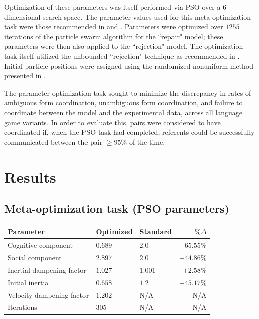 \documentclass[12pt,a4paper]{article}
\begin{document}
Optimization of these parameters was itself performed via PSO over a $6$-dimensional search space. The parameter values used for this meta-optimization task were those recommended in \cite{shi1998} and \cite{solnon2010}. Parameters were optimized over $1255$ iterations of the particle swarm algorithm for the ``repair" model; these parameters were then also applied to the ``rejection" model. The optimization task itself utilized the unbounded ``rejection" technique as recommended in \cite{engelbrecht2005}. Initial particle positions were assigned using the randomized nonuniform method presented in \cite{mitchell1991}.

The parameter optimization task sought to minimize the discrepancy in rates of ambiguous form coordination, unambiguous form coordination, and failure to coordinate between the model and the experimental data, across all language game variants. In order to evaluate this, pairs were considered to have coordinated if, when the PSO task had completed, referents could be successfully communicated between the pair $\geq 95\%$ of the time.


\section{Results}
\subsection{Meta-optimization task (PSO parameters)}
\begin{center}
    \begin{tabular}{ l l l r }
    Parameter & Optimized & Standard & $\% \Delta$ \\ \hline
    Cognitive component       & $0.689$ & $2.0$   & $-65.55\%$ \\ \hline
    Social component          & $2.897$ & $2.0$   & $+44.86\%$ \\ \hline
    Inertial dampening factor & $1.027$ & $1.001$ & $+2.58\%$\\ \hline
    Initial inertia           & $0.658$ & $1.2$   & $-45.17\%$ \\ \hline
    Velocity dampening factor & $1.202$ & N/A     & N/A\\ \hline
    Iterations                & $305$   & N/A     & N/A\\ 
    \end{tabular}
\end{center}
\end{document}
